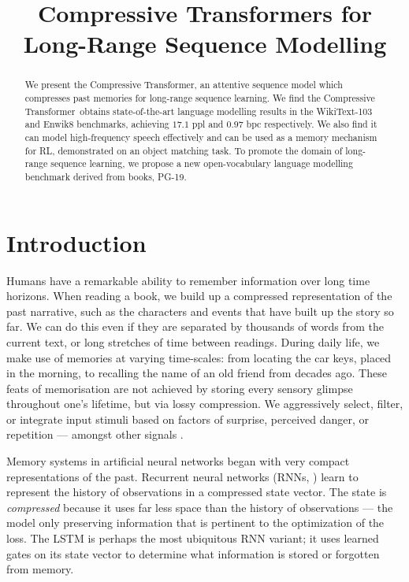 \title{Compressive Transformers for Long-Range Sequence Modelling}

\begin{abstract}
We present the Compressive Transformer, an attentive sequence model which compresses past memories for long-range sequence learning. We find the Compressive Transformer~obtains state-of-the-art language modelling results in the WikiText-103 and Enwik8 benchmarks, achieving $17.1$ ppl and $0.97$ bpc respectively. We also find it can model high-frequency speech effectively and can be used as a memory mechanism for RL, demonstrated on an object matching task. To promote the domain of long-range sequence learning, we propose a new open-vocabulary language modelling benchmark derived from books, PG-19.
\end{abstract}

\section{Introduction}
Humans have a remarkable ability to remember information over long time horizons. When reading a book, we build up a compressed representation of the past narrative, such as the characters and events that have built up the story so far. We can do this even if they are separated by thousands of words from the current text, or long stretches of time between readings. During daily life, we make use of memories at varying time-scales: from locating the car keys, placed in the morning, to recalling the name of an old friend from decades ago. These feats of memorisation are not achieved by storing every sensory glimpse throughout one's lifetime, but via lossy compression. We aggressively select, filter, or integrate input stimuli based on factors of surprise, perceived danger, or repetition --- amongst other signals \citep{richards2017persistence}.

Memory systems in artificial neural networks began with very compact representations of the past. Recurrent neural networks (RNNs, \citet{rumelhart1986learning}) learn to represent the history of observations in a compressed state vector. The state is \textit{compressed} because it uses far less space than the history of observations --- the model only preserving information that is pertinent to the optimization of the loss. The LSTM \citep{hochreiter1997long} is perhaps the most ubiquitous RNN variant; it uses learned gates on its state vector to determine what information is stored or forgotten from memory. 

